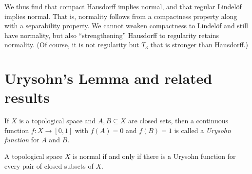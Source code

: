 \documentclass[article, a4paper, 11pt, oneside]{memoir}
\numberwithin{equation}{chapter}
\begin{document}
We thus find that compact Hausdorff implies normal, and that regular Lindelöf implies normal. That is, normality follows from a compactness property along with a separability property. We cannot weaken compactness to Lindelöf and still have normality, but also \enquote{strengthening} Hausdorff to regularity retains normality. (Of course, it is not regularity but $T_3$ that is stronger than Hausdorff.)


\section{Urysohn's Lemma and related results}

If $X$ is a topological space and $A,B \subseteq X$ are closed sets, then a continuous function $f \colon X \to [0,1]$ with $f(A) = 0$ and $f(B) = 1$ is called a \emph{Urysohn function} for $A$ and $B$.

\begin{theorem}
    A topological space $X$ is normal if and only if there is a Urysohn function for every pair of closed subsets of $X$.
\end{theorem}
\end{document}
